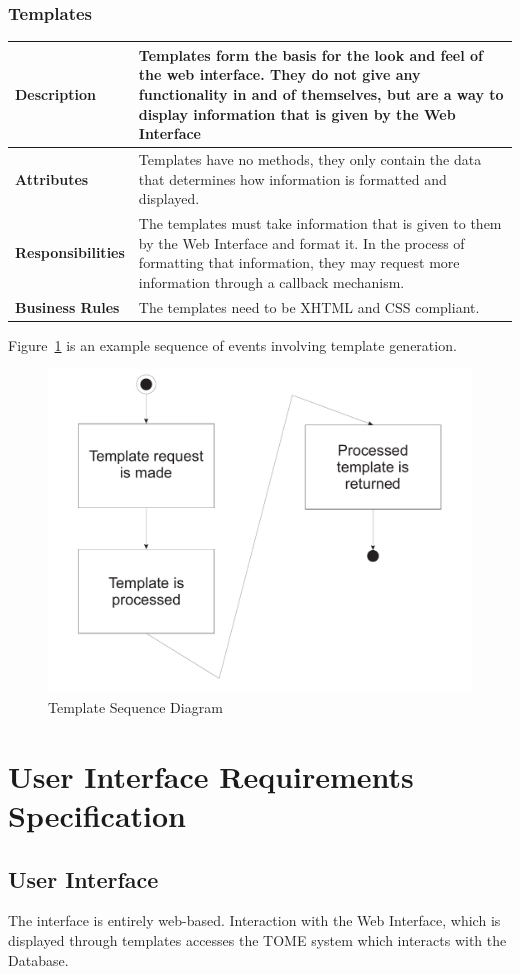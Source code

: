 \documentclass[12pt,titlepage]{article}
\begin{document}
\subsubsection{Templates}
\begin{longtable}{|p{}|p{}|}
	\hline
	\textbf{Description} & Templates form the basis for the look and feel of the web interface.  They do not give any functionality in and of themselves, but are a way to display information that is given by the Web Interface\\
	\hline
	\textbf{Attributes} & Templates have no methods, they only contain the data that determines how information is formatted and displayed.\\
	\hline
	\textbf{Responsibilities} & The templates must take information that is given to them by the Web Interface and format it.  In the process of formatting that information, they may request more information through a callback mechanism.\\
	\hline
	\textbf{Business Rules} & The templates need to be XHTML and CSS compliant. \\
	\hline
\end{longtable}
Figure~\ref{TemplateSequenceDiagram} is an example sequence of events involving template generation.
\begin{figure}[h]
	\centering
	\includegraphics[width=.5\textwidth]{TemplateSequenceDiagram}
	\caption{Template Sequence Diagram}
	\label{TemplateSequenceDiagram}
\end{figure}

\section{User Interface Requirements Specification}
\subsection{User Interface}
The interface is entirely web-based.  Interaction with the Web Interface, which is displayed through templates accesses the TOME system which interacts with the Database.
\end{document}
